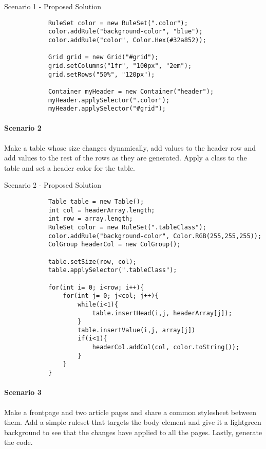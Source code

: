 \documentclass[12pt]{article}
\begin{document}
        \begin{shaded}
            Scenario 1 - Proposed Solution
            \begin{lstlisting}
            RuleSet color = new RuleSet(".color");
            color.addRule("background-color", "blue");
            color.addRule("color", Color.Hex(#32a852));

            Grid grid = new Grid("#grid");
            grid.setColumns("1fr", "100px", "2em");
            grid.setRows("50%", "120px");

            Container myHeader = new Container("header");
            myHeader.applySelector(".color");
            myHeader.applySelector("#grid");
            \end{lstlisting}
        \end{shaded}

        \paragraph{Scenario 2}
        Make a table whose size changes dynamically, add values to the header row and add values to the rest of the rows as they are generated. Apply a class to the table and set a header color for the table.

        \begin{shaded}
            Scenario 2 - Proposed Solution
            \begin{lstlisting}
            Table table = new Table();
            int col = headerArray.length;
            int row = array.length;
            RuleSet color = new RuleSet(".tableClass");
            color.addRule("background-color", Color.RGB(255,255,255));
            ColGroup headerCol = new ColGroup();

            table.setSize(row, col);
            table.applySelector(".tableClass");

            for(int i= 0; i<row; i++){
                for(int j= 0; j<col; j++){
                    while(i<1){
                        table.insertHead(i,j, headerArray[j]);
                    }
                    table.insertValue(i,j, array[j])
                    if(i<1){
                        headerCol.addCol(col, color.toString());
                    }
                }
            }
            \end{lstlisting}
        \end{shaded}

        \paragraph{Scenario 3}
        Make a frontpage and two article pages and share a common stylesheet between them. Add a simple ruleset that targets the body element and give it a lightgreen background to see that the changes have applied to all the pages. Lastly, generate the code.
\end{document}
